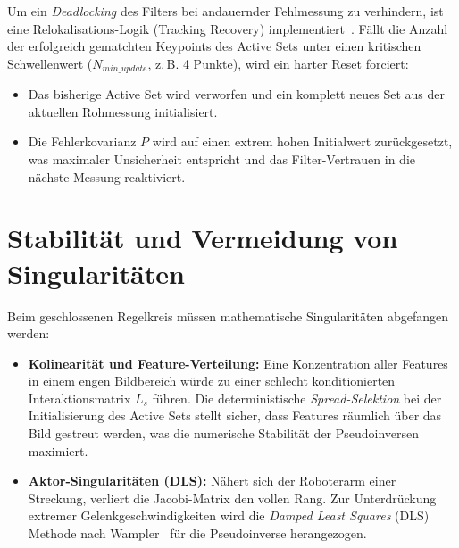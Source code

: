 Um ein \textit{Deadlocking} des Filters bei andauernder Fehlmessung zu verhindern, ist eine Relokalisations-Logik (Tracking Recovery) implementiert~\cite{williams2007real}. Fällt die Anzahl der erfolgreich gematchten Keypoints des Active Sets unter einen kritischen Schwellenwert ($N_{min\_update}$, z.\,B. 4 Punkte), wird ein harter Reset forciert:
\begin{itemize}
    \item Das bisherige Active Set wird verworfen und ein komplett neues Set aus der aktuellen Rohmessung initialisiert.
    \item Die Fehlerkovarianz $P$ wird auf einen extrem hohen Initialwert zurückgesetzt, was maximaler Unsicherheit entspricht und das Filter-Vertrauen in die nächste Messung reaktiviert.
\end{itemize}

\section{Stabilität und Vermeidung von Singularitäten}
\label{sec:Singularitaeten}
Beim geschlossenen Regelkreis müssen mathematische Singularitäten abgefangen werden:
\begin{itemize}
    \item \textbf{Kolinearität und Feature-Verteilung:} Eine Konzentration aller Features in einem engen Bildbereich würde zu einer schlecht konditionierten Interaktionsmatrix $L_s$ führen. Die deterministische \textit{Spread-Selektion} bei der Initialisierung des Active Sets stellt sicher, dass Features räumlich über das Bild gestreut werden, was die numerische Stabilität der Pseudoinversen maximiert.
    \item \textbf{Aktor-Singularitäten (DLS):} Nähert sich der Roboterarm einer Streckung, verliert die Jacobi-Matrix den vollen Rang. Zur Unterdrückung extremer Gelenkgeschwindigkeiten wird die \textit{Damped Least Squares} (DLS) Methode nach Wampler~\cite{wampler1986manipulator} für die Pseudoinverse herangezogen.
\end{itemize}

